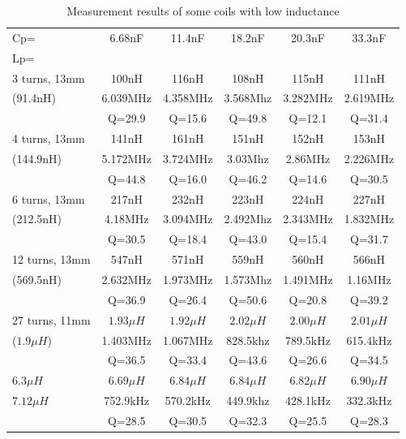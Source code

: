 \begin{table}[H]
\begin{center}
\begin{tabular}{| l | c | c | c | c | c |}
\hline
\hspace{1.5cm} Cp= & 6.68nF    & 11.4nF    & 18.2nF    & 20.3nF    & 33.3nF \\
Lp=           &           &           &           &           &        \\
\hline
\hline
3 turns, 13mm & 100nH     & 116nH     & 108nH     & 115nH     & 111nH  \\
 (91.4nH) & 6.039MHz  & 4.358MHz  & 3.568Mhz  & 3.282MHz  & 2.619MHz \\
              & Q=29.9    & Q=15.6    & Q=49.8    & Q=12.1    & Q=31.4  \\
\hline
4 turns, 13mm & 141nH     & 161nH     & 151nH     & 152nH     & 153nH  \\
 (144.9nH)     & 5.172MHz  & 3.724MHz  & 3.03Mhz   & 2.86MHz   & 2.226MHz \\
              & Q=44.8    & Q=16.0    & Q=46.2    & Q=14.6    & Q=30.5  \\
\hline
6 turns, 13mm & 217nH     & 232nH     & 223nH     & 224nH     & 227nH  \\
 (212.5nH)    & 4.18MHz   & 3.094MHz  & 2.492Mhz  & 2.343MHz  & 1.832MHz \\
              & Q=30.5    & Q=18.4    & Q=43.0    & Q=15.4    & Q=31.7  \\
\hline
12 turns, 13mm     & 547nH     & 571nH     & 559nH     & 560nH     & 566nH  \\
 (569.5nH)    & 2.632MHz  & 1.973MHz  & 1.573Mhz  & 1.491MHz  & 1.16MHz \\
              & Q=36.9    & Q=26.4    & Q=50.6    & Q=20.8    & Q=39.2  \\
\hline
27 turns, 11mm & \(1.93\mu H\) & \(1.92\mu H\) & \(2.02\mu H\) & \(2.00\mu H\) & \(2.01\mu H\)  \\
(\(1.9\mu H\)) & 1.403MHz  & 1.067MHz  & 828.5khz  & 789.5kHz  & 615.4kHz \\
              & Q=36.5    & Q=33.4    & Q=43.6    & Q=26.6    & Q=34.5  \\
\hline
\(6.3\mu H\)  & \(6.69\mu H\) & \(6.84\mu H\) & \(6.84\mu H\) & \(6.82\mu H\) & \(6.90\mu H\)  \\
\(7.12\mu H\) & 752.9kHz  & 570.2kHz  & 449.9khz  & 428.1kHz  & 332.3kHz \\
              & Q=28.5    & Q=30.5    & Q=32.3    & Q=25.5    & Q=28.3  \\
\hline
\end{tabular}
\end{center}
\caption{Measurement results of some coils with low inductance}
\label{tab:littleInductors}
\end{table}

